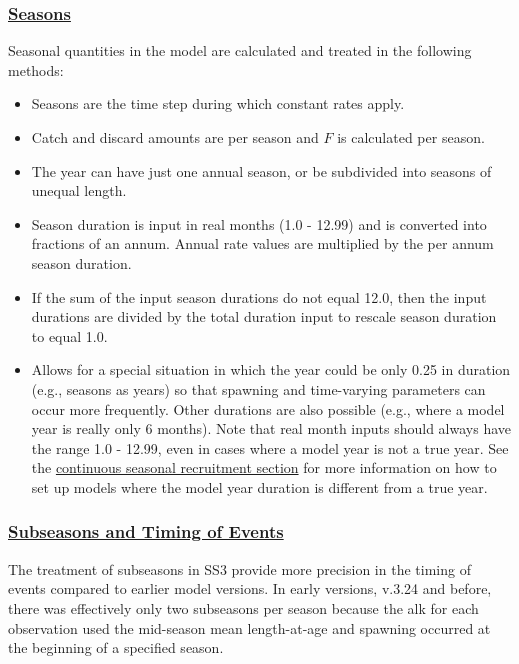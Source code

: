 \hypertarget{Seasons}{}
\subsubsection[Seasons]{\protect\hyperlink{Seasons}{Seasons}}
Seasonal quantities in the model are calculated and treated in the following methods:
	 \begin{itemize}
	 	\item Seasons are the time step during which constant rates apply.
	 	\item Catch and discard amounts are per season and $F$ is calculated per season.
	 	\item The year can have just one annual season, or be subdivided into seasons of unequal length.
	 	\item Season duration is input in real months (1.0 - 12.99) and is converted into fractions of an annum. Annual rate values are multiplied by the per annum season duration.
	 	\item If the sum of the input season durations do not equal 12.0, then the input durations are divided by the total duration input to rescale season duration to equal 1.0.  
	 	\item Allows for a special situation in which the year could be only 0.25 in duration (e.g., seasons as years) so that spawning and time-varying parameters can occur more frequently. Other durations are also possible (e.g., where a model year is really only 6 months). Note that real month inputs should always have the range 1.0 - 12.99, even in cases where a model year is not a true year. See the \hyperlink{continuous-seasonal-recruitment-sec}{continuous seasonal recruitment section} for more information on how to set up models where the model year duration is different from a true year.
	 \end{itemize}

\hypertarget{SubSeas}{}
\subsubsection[Subseasons and Timing of Events]{\protect\hyperlink{SubSeas}{Subseasons and Timing of Events}}
The treatment of subseasons in SS3 provide more precision in the timing of events compared to earlier model versions. In early versions, v.3.24 and before, there was effectively only two subseasons per season because the \gls{alk} for each observation used the mid-season mean length-at-age and spawning occurred at the beginning of a specified season.  

